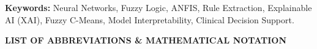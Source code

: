 \documentclass{report}
\begin{document}
\vspace{0.35cm}
\noindent \textbf{Keywords:} Neural Networks, Fuzzy Logic, ANFIS, Rule Extraction, Explainable AI (XAI), Fuzzy C-Means, Model Interpretability, Clinical Decision Support.

\clearpage
\begingroup
\linespread{0.95}\selectfont
\small
\setlength{\parskip}{0pt}
\setcounter{tocdepth}{0}
\makeatletter
\def\@makeschapterhead#1{%
  \vspace*{2\p@}%
  {\parindent \z@ \centering \normalfont
    {\fontsize{14}{17}\selectfont \bfseries TABLE OF CONTENTS}\par\nobreak
    \vskip 10\p@
  }}
\makeatother
\tableofcontents
\endgroup

\clearpage
{}
\begingroup
\linespread{1.15}\selectfont
\setlength{\parskip}{0pt}
\makeatletter
\def\@makeschapterhead#1{%
  \vspace*{2\p@}%
  {\parindent \z@ \centering \normalfont
    {\fontsize{14}{17}\selectfont \bfseries \MakeUppercase{#1}}\par\nobreak
    \vskip 14\p@
  }}
\makeatother
\setcounter{tocdepth}{1}
\listoffigures
\endgroup

\clearpage
{}
\begingroup
\linespread{1.10}\selectfont
\setlength{\parskip}{0pt}
\makeatletter
\def\@makeschapterhead#1{%
  \vspace*{2\p@}%
  {\parindent \z@ \centering \normalfont
    {\fontsize{14}{17}\selectfont \bfseries \MakeUppercase{#1}}\par\nobreak
    \vskip 14\p@
  }}
\makeatother
\setcounter{tocdepth}{1}
\listoftables
\endgroup

\clearpage
{}
\begin{center}
    {\fontsize{14}{17}\selectfont \bfseries LIST OF ABBREVIATIONS \& MATHEMATICAL NOTATION}\\[0.25cm]
\end{center}
\end{document}
